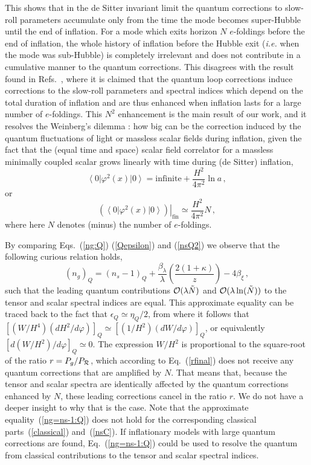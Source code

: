 \documentclass[aps,12pt,superscriptaddress,preprintnumbers,
                secnumarabic,nofootinbib,showpacs]{revtex4}
\begin{document}
This shows that in the de Sitter
invariant limit the quantum corrections to slow-roll parameters
accumulate only from the time the mode becomes super-Hubble until
the end of inflation. For a mode which exits horizon $N$
$e$-foldings before the end of inflation, the whole history of
inflation before the Hubble exit ({\it i.e.} when the mode was
sub-Hubble) is completely irrelevant and does not contribute in a
cumulative manner to the quantum corrections. This disagrees with
the result found in Refs.~\cite{Sloth:2006az,Sloth:2006nu}, where
it is claimed that the quantum loop corrections induce corrections
to the slow-roll parameters and spectral indices which depend on
the total duration of inflation and are thus enhanced when
inflation lasts for a large number of $e$-foldings.
 This $N^2$ enhancement is the main result of our work, and it
resolves the Weinberg's dilemma \cite{Weinberg:2005,Weinberg:2006}:
how big can be the correction induced by the quantum fluctuations
of light or massless scalar fields during inflation,
given the fact that the (equal time and space) scalar
field correlator for a massless minimally coupled scalar grows
linearly with time during (de Sitter) inflation,
\begin{equation}
\left<0\right|\varphi^2(x)\left|0\right> = \mathrm{infinite}
+\frac{H^2}{4\pi^2}\ln a\,,
\end{equation}
or
\begin{equation}
\left.\left(\left<0\right|\varphi^2(x)\left|0\right>\right)\right|_{\mathrm{fin}}
\simeq \frac{H^2}{4\pi^2}N\,,
\end{equation}
where here $N$ denotes (minus) the number of $e$-foldings.

 By comparing Eqs.~(\ref{ng:Q}) (\ref{Qepsilon}) and (\ref{nsQ2}) 
we observe that the following curious relation holds, 
\begin{equation}
(n_g)_Q = (n_s-1)_Q 
        + \frac{\beta_\lambda}{\lambda}
                \left(\frac{2(1+\kappa)}{z}
                \right)
         -4 \beta_\xi
\,,
\label{ng=ns-1:Q}
\end{equation}
such that the leading quantum contributions ${\cal O}(\lambda \tilde N)$
and ${\cal O}(\lambda \ln(\tilde N))$
to the tensor and scalar spectral indices are equal. 
This approximate equality can be traced back to the fact that 
$\epsilon_Q\simeq \eta_Q/2$, from where it follows that 
$[(W/H^4)(dH^2/d\varphi)]_Q\simeq [(1/H^2) (dW/d\varphi)]_Q$,
or equivalently $[d(W/H^2)/d\varphi]_Q\simeq 0$. The expression 
$W/H^2$ is proportional to the square-root of the ratio 
$r=P_g/P_{\cal R}$, which according to Eq.~(\ref{rfinal}) 
does not receive any quantum corrections that are amplified by $N$. That means
that, because the tensor and scalar spectra are identically 
affected by the quantum corrections enhanced by $N$, 
these leading corrections cancel in the ratio $r$.
We do not have a deeper insight to why that is the case. 
Note that the approximate equality~(\ref{ng=ns-1:Q}) does not 
hold for the corresponding classical parts~(\ref{classical}) and~(\ref{nsC}).
 If inflationary models with large quantum corrections are found, 
Eq.~(\ref{ng=ns-1:Q}) could be used to resolve the quantum
from classical contributions to the tensor and scalar spectral indices. 
\end{document}
